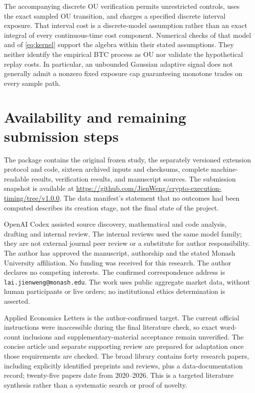 \documentclass[11pt]{article}
\begin{document}
The accompanying discrete OU verification permits unrestricted controls, uses the exact sampled OU transition, and charges a specified discrete interval exposure. That interval cost is a discrete-model assumption rather than an exact integral of every continuous-time cost component. Numerical checks of that model and of \eqref{eq:kernel} support the algebra within their stated assumptions. They neither identify the empirical BTC process as OU nor validate the hypothetical replay costs. In particular, an unbounded Gaussian adaptive signal does not generally admit a nonzero fixed exposure cap guaranteeing monotone trades on every sample path.



\section{Availability and remaining submission steps}
The package contains the original frozen study, the separately versioned extension protocol and code, sixteen archived inputs and checksums, complete machine-readable results, verification results, and manuscript sources. The submission snapshot is available at \url{https://github.com/JienWeng/crypto-execution-timing/tree/v1.0.0}. The data manifest's statement that no outcomes had been computed describes its creation stage, not the final state of the project.

OpenAI Codex assisted source discovery, mathematical and code analysis, drafting and internal review. The internal reviews used the same model family; they are not external journal peer review or a substitute for author responsibility. The author has approved the manuscript, authorship and the stated Monash University affiliation. No funding was received for this research. The author declares no competing interests. The confirmed correspondence address is \texttt{lai.jienweng@monash.edu}. The work uses public aggregate market data, without human participants or live orders; no institutional ethics determination is asserted.

Applied Economics Letters is the author-confirmed target. The current official instructions were inaccessible during the final literature check, so exact word-count inclusions and supplementary-material acceptance remain unverified. The concise article and separate supporting review are prepared for adaptation once those requirements are checked. The broad library contains forty research papers, including explicitly identified preprints and reviews, plus a data-documentation record; twenty-five papers date from 2020--2026. This is a targeted literature synthesis rather than a systematic search or proof of novelty.
\begingroup\raggedright


\endgroup
\end{document}
